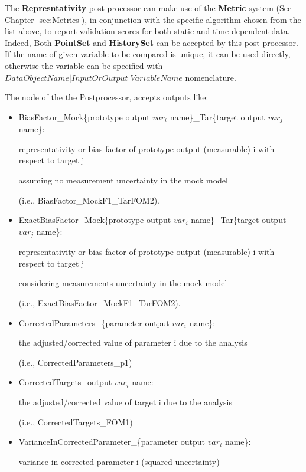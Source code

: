The \textbf{Represntativity} post-processor can make use of the \textbf{Metric} system (See Chapter \ref{sec:Metrics}),
in conjunction with the specific algorithm chosen from the list above,
to report validation scores for both static and time-dependent data.
Indeed, Both \textbf{PointSet} and \textbf{HistorySet} can be accepted by this post-processor.
If the name of given variable to be compared is unique, it can be used directly, otherwise the variable can be specified
with $DataObjectName|InputOrOutput|VariableName$ nomenclature.

The  node of the  the  Postprocessor, accepts outputs like:
\begin{itemize}
  \item BiasFactor\_Mock\{prototype output $var_i$  name\}\_Tar\{target output $var_j$ name\}:

    representativity or bias factor of prototype output (measurable) i with respect to target j

    	assuming no measurement uncertainty in the mock model

    	 (i.e., BiasFactor\_MockF1\_TarFOM2).

  \item ExactBiasFactor\_Mock\{prototype output $var_i$ name\}\_Tar\{target output $var_j$ name\}:

   representativity or bias factor of prototype output (measurable) i with respect to target j

    considering measurements uncertainty in the mock model

     (i.e., ExactBiasFactor\_MockF1\_TarFOM2).

  \item CorrectedParameters\_\{parameter output $var_i$ name\}:

  the adjusted/corrected value of parameter i due to the analysis

  (i.e., CorrectedParameters\_p1)

  \item CorrectedTargets\_{output $var_i$ name}:

  the adjusted/corrected value of  target i due to the analysis

  (i.e., CorrectedTargets\_FOM1)

  \item VarianceInCorrectedParameter\_\{parameter output $var_i$ name\}:

 variance in corrected parameter i (squared uncertainty)


\end{itemize}
